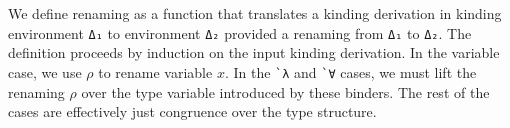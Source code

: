 \documentclass[authoryear, acmsmall, screen, review, nonacm]{acmart}
\begin{document}
\begin{code}%
\>[0]\AgdaSpace{}%
\AgdaSymbol{:}\AgdaSpace{}%
\AgdaSpace{}%
\AgdaSpace{}%
\AgdaSpace{}%
\AgdaSpace{}%
\AgdaSpace{}%
\AgdaSymbol{(}\AgdaSpace{}%
\AgdaOperator{\AgdaInductiveConstructor{,,}}\AgdaSpace{}%
\AgdaSymbol{)}\AgdaSpace{}%
\AgdaSymbol{(}\AgdaSpace{}%
\AgdaOperator{\AgdaInductiveConstructor{,,}}\AgdaSpace{}%
\AgdaSymbol{)}\<%
\\
\>[0]\AgdaSpace{}%
\AgdaSpace{}%
\AgdaSpace{}%
\AgdaSymbol{=}\AgdaSpace{}%
\<%
\\
\>[0]\AgdaSpace{}%
\AgdaSpace{}%
\AgdaSymbol{(}\AgdaSpace{}%
\AgdaSymbol{)}\AgdaSpace{}%
\AgdaSymbol{=}\AgdaSpace{}%
\AgdaSpace{}%
\AgdaSymbol{(}\AgdaSpace{}%
\AgdaSymbol{)}\<%
\end{code}

We define renaming as a function that translates a kinding derivation in kinding environment \verb!Δ₁! to environment \verb!Δ₂! provided a renaming from \verb!Δ₁! to \verb!Δ₂!. The definition proceeds by induction on the input kinding derivation. In the variable case, we use $\rho$ to rename variable $x$. In the \verb!`λ! and \verb!`∀! cases, we must lift the renaming $\rho$ over the type variable introduced by these binders. The rest of the cases are effectively just congruence over the type structure.
\end{document}
